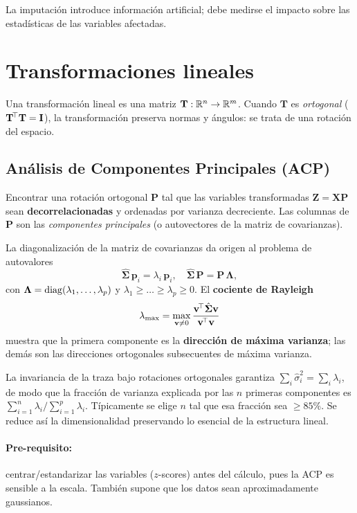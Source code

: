 La imputación introduce información artificial; debe medirse el impacto
sobre las estadísticas de las variables afectadas.

\section{Transformaciones lineales}

Una transformación lineal es una matriz $\mathbf{T}:\mathbb{R}^n\to\mathbb{R}^m$.
Cuando $\mathbf{T}$ es \emph{ortogonal}
($\mathbf{T}^{\!\top}\mathbf{T}=\mathbf{I}$), la transformación preserva normas
y ángulos: se trata de una rotación del espacio.

\subsection{Análisis de Componentes Principales (ACP)}

\begin{conceito}
Encontrar una rotación ortogonal $\mathbf{P}$ tal que las variables
transformadas $\mathbf{Z}=\mathbf{X}\mathbf{P}$ sean
\textbf{decorrelacionadas} y ordenadas por varianza decreciente. Las
columnas de $\mathbf{P}$ son las \emph{componentes principales} (o
autovectores de la matriz de covarianzas).
\end{conceito}

La diagonalización de la matriz de covarianzas da origen al problema de
autovalores
\[
\hat{\boldsymbol{\Sigma}}\,\mathbf{p}_i = \lambda_i\,\mathbf{p}_i,
\quad
\hat{\boldsymbol{\Sigma}}\,\mathbf{P} = \mathbf{P}\,\boldsymbol\Lambda,
\]
con $\boldsymbol\Lambda=\operatorname{diag}(\lambda_1,\dots,\lambda_p)$ y
$\lambda_1\geq\dots\geq\lambda_p\geq 0$. El \textbf{cociente de
Rayleigh}
\[
\lambda_{\max}=\max_{\mathbf{v}\neq 0}\frac{\mathbf{v}^{\!\top}\hat{\boldsymbol{\Sigma}}\mathbf{v}}
                                            {\mathbf{v}^{\!\top}\mathbf{v}}
\]
muestra que la primera componente es la \textbf{dirección de máxima
varianza}; las demás son las direcciones ortogonales subsecuentes de
máxima varianza.

La invariancia de la traza bajo rotaciones ortogonales garantiza
$\sum_i \hat{\sigma}_i^2 = \sum_i \lambda_i$, de modo que la fracción
de varianza explicada por las $n$ primeras componentes es
$\sum_{i=1}^n \lambda_i/\sum_{i=1}^p \lambda_i$. Típicamente se elige
$n$ tal que esa fracción sea $\geq 85\%$. Se reduce así la
dimensionalidad preservando lo esencial de la estructura lineal.

\paragraph{Pre-requisito:} centrar/estandarizar las variables
($z$-scores) antes del cálculo, pues la ACP es sensible a la escala.
También supone que los datos sean aproximadamente gaussianos.

